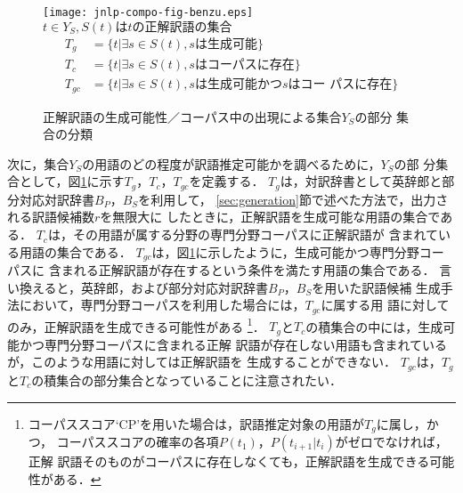 \documentclass[japanese]{jnlp_1.3a}
\begin{document}
\begin{figure}[t]
 \centering
     \texttt{[image: jnlp-compo-fig-benzu.eps]}
      $ t \in Y_S, S(t) \mbox{は$t$の正解訳語の集合}$ 
 \begin{align*}
  T_g & = \{t | \exists s \in S(t),s \mbox{は生成可能}\}\\
  T_c & = \{t | \exists s \in S(t),s \mbox{はコーパスに存在}\}\\
  T_{gc} & = \{t | \exists s \in S(t),s \mbox{は生成可能かつ} s \mbox{はコー
   パスに存在}\}
 \end{align*}
 \caption{正解訳語の生成可能性／コーパス中の出現による集合$Y_S$の部分
 集合の分類}
 \label{fig:benzu}
\end{figure}

次に，集合$Y_S$の用語のどの程度が訳語推定可能かを調べるために，$Y_S$の部
分集合として，図\ref{fig:benzu}に示す$T_g$，$T_c$，$T_{gc}$を定義する．
$T_g$は，対訳辞書として英辞郎と部分対応対訳辞書$B_P$，$B_S$を利用して，
\ref{sec:generation}節で述べた方法で，出力される訳語候補数$r$を無限大に
したときに，正解訳語を生成可能な用語の集合である．
$T_c$は，その用語が属する分野の専門分野コーパスに正解訳語が
含まれている用語の集合である．
$T_{gc}$は，図\ref{fig:benzu}に示したように，生成可能かつ専門分野コーパスに
含まれる正解訳語が存在するという条件を満たす用語の集合である．
言い換えると，英辞郎，および部分対応対訳辞書$B_P$，$B_S$を用いた訳語候補
生成手法において，専門分野コーパスを利用した場合には，$T_{gc}$に属する用
語に対してのみ，正解訳語を生成できる可能性がある
\footnote{
コーパススコア`CP'を用いた場合は，訳語推定対象の用語が$T_g$に属し，かつ，
コーパススコアの確率の各項$P(t_1)$，$P(t_{i+1}|t_i)$がゼロでなければ，正解
訳語そのものがコーパスに存在しなくても，正解訳語を生成できる可能性が{\linebreak}ある．
}．
$T_g$と$T_c$の積集合の中には，生成可能かつ専門分野コーパスに含まれる正解
訳語が存在しない用語も含まれているが，このような用語に対しては正解訳語を
生成することができない．
$T_{gc}$は，$T_g$と$T_c$の積集合の部分集合となっていることに注意されたい．
\end{document}

